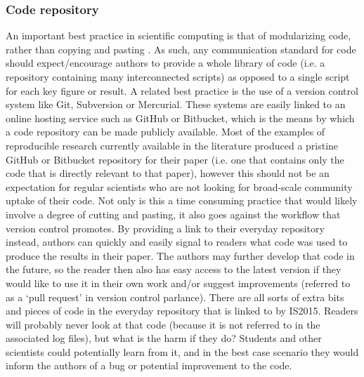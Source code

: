 \subsubsection{Code repository}

An important best practice in scientific computing is that of modularizing code, rather than copying and pasting \citep{Wilson2014a}. As such, any communication standard for code should expect/encourage authors to provide a whole library of code (i.e. a repository containing many interconnected scripts) as opposed to a single script for each key figure or result. A related best practice is the use of a version control system like Git, Subversion or Mercurial. These systems are easily linked to an online hosting service such as GitHub or Bitbucket, which is the means by which a code repository can be made publicly available. Most of the examples of reproducible research currently available in the literature produced a pristine GitHub or Bitbucket repository for their paper (i.e. one that contains only the code that is directly relevant to that paper), however this should not be an expectation for regular scientists who are not looking for broad-scale community uptake of their code. Not only is this a time consuming practice that would likely involve a degree of cutting and pasting, it also goes against the workflow that version control promotes. By providing a link to their everyday repository instead, authors can quickly and easily signal to readers what code was used to produce the results in their paper. The authors may further develop that code in the future, so the reader then also has easy access to the latest version if they would like to use it in their own work and/or suggest improvements (referred to as a `pull request' in version control parlance). There are all sorts of extra bits and pieces of code in the everyday repository that is linked to by IS2015. Readers will probably never look at that code (because it is not referred to in the associated log files), but what is the harm if they do? Students and other scientists could potentially learn from it, and in the best case scenario they would inform the authors of a bug or potential improvement to the code.        

